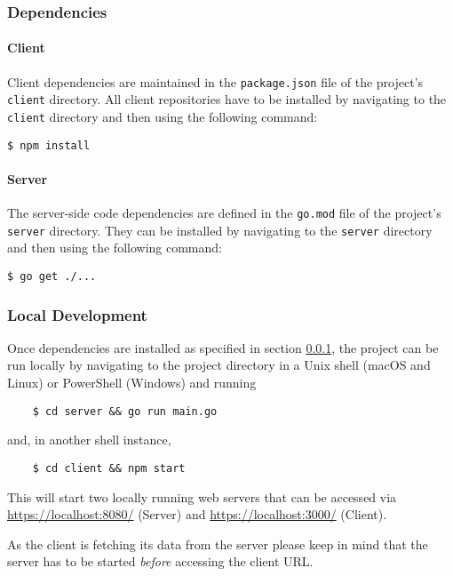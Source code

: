 \subsubsection{Dependencies}
\label{subsub:dependencies}

\paragraph{Client}
Client dependencies are maintained in the \texttt{package.json} file of the project's \texttt{client} directory. All client repositories have to be installed by navigating to the \texttt{client} directory and then using the following command:
\begin{verbatim}
$ npm install
\end{verbatim}

\paragraph{Server}
The server-side code dependencies are defined in the \texttt{go.mod} file of the project's \texttt{server} directory. They can be installed by navigating to the \texttt{server} directory and then using the following command:
\begin{verbatim}
$ go get ./...
\end{verbatim}

\subsubsection{Local Development}
Once dependencies are installed as specified in section \ref{subsub:dependencies}, the project can be run locally by navigating to the project directory in a Unix shell (macOS and Linux) or PowerShell (Windows) and running

\begin{verbatim}
    $ cd server && go run main.go
\end{verbatim}
and, in another shell instance,
\begin{verbatim}
    $ cd client && npm start
\end{verbatim}

This will start two locally running web servers that can be accessed via \url{https://localhost:8080/} (Server) and \url{https://localhost:3000/} (Client).

\begin{note}
As the client is fetching its data from the server please keep in mind that the server has to be started \textit{before} accessing the client URL.
\end{note}

